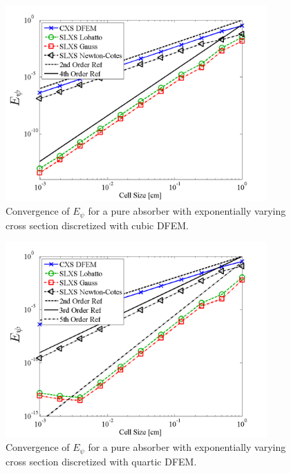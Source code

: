 \begin{figure}[!htp]
\centering
\includegraphics[width=10cm]{chapter3_variable_xs/P3_VarXS_E_psi_L2.png}
\caption{Convergence of $E_{\psi}$ for a pure absorber with exponentially varying cross section discretized with cubic DFEM.}
\label{fig:varxs_psi_L2_p3}
\end{figure}
%
\begin{figure}[!hbp]
\centering
\includegraphics[width=10cm]{chapter3_variable_xs/P4_VarXS_E_psi_L2.png}
\caption{Convergence of $E_{\psi}$ for a pure absorber with exponentially varying cross section discretized with quartic DFEM.}
\label{fig:varxs_psi_L2_p4}
\end{figure}


